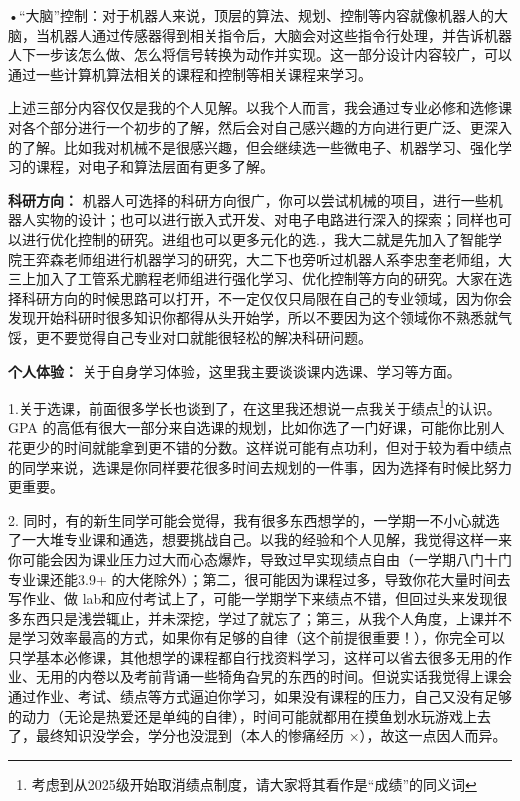 \documentclass[11pt,oneside]{book}
\begin{document}
\vspace{10pt}

•“大脑”控制：对于机器人来说，顶层的算法、规划、控制等内容就像机器人的大脑，当机器人通过传感器得到相关指令后，大脑会对这些指令行处理，并告诉机器人下一步该怎么做、怎么将信号转换为动作并实现。这一部分设计内容较广，可以通过一些计算机算法相关的课程和控制等相关课程来学习。

\vspace{10pt}

上述三部分内容仅仅是我的个人见解。以我个人而言，我会通过专业必修和选修课对各个部分进行一个初步的了解，然后会对自己感兴趣的方向进行更广泛、更深入的了解。比如我对机械不是很感兴趣，但会继续选一些微电子、机器学习、强化学习的课程，对电子和算法层面有更多了解。

\vspace{10pt}

\textbf{科研方向：}
机器人可选择的科研方向很广，你可以尝试机械的项目，进行一些机器人实物的设计；也可以进行嵌入式开发、对电子电路进行深入的探索；同样也可以进行优化控制的研究。进组也可以更多元化的选.，我大二就是先加入了智能学院王弈森老师组进行机器学习的研究，大二下也旁听过机器人系李忠奎老师组，大三上加入了工管系尤鹏程老师组进行强化学习、优化控制等方向的研究。大家在选择科研方向的时候思路可以打开，不一定仅仅只局限在自己的专业领域，因为你会发现开始科研时很多知识你都得从头开始学，所以不要因为这个领域你不熟悉就气馁，更不要觉得自己专业对口就能很轻松的解决科研问题。

\vspace{10pt}

\textbf{个人体验：}
关于自身学习体验，这里我主要谈谈课内选课、学习等方面。

\vspace{10pt}

1.关于选课，前面很多学长也谈到了，在这里我还想说一点我关于绩点\footnote{考虑到从2025级开始取消绩点制度，请大家将其看作是“成绩”的同义词}的认识。GPA 的高低有很大一部分来自选课的规划，比如你选了一门好课，可能你比别人花更少的时间就能拿到更不错的分数。这样说可能有点功利，但对于较为看中绩点的同学来说，选课是你同样要花很多时间去规划的一件事，因为选择有时候比努力更重要。

\vspace{10pt}

2. 同时，有的新生同学可能会觉得，我有很多东西想学的，一学期一不小心就选了一大堆专业课和通选，想要挑战自己。以我的经验和个人见解，我觉得这样一来你可能会因为课业压力过大而心态爆炸，导致过早实现绩点自由（一学期八门十门专业课还能3.9+ 的大佬除外）；第二，很可能因为课程过多，导致你花大量时间去写作业、做 lab和应付考试上了，可能一学期学下来绩点不错，但回过头来发现很多东西只是浅尝辄止，并未深挖，学过了就忘了；第三，从我个人角度，上课并不是学习效率最高的方式，如果你有足够的自律（这个前提很重要！），你完全可以只学基本必修课，其他想学的课程都自行找资料学习，这样可以省去很多无用的作业、无用的内卷以及考前背诵一些犄角旮旯的东西的时间。但说实话我觉得上课会通过作业、考试、绩点等方式逼迫你学习，如果没有课程的压力，自己又没有足够的动力（无论是热爱还是单纯的自律），时间可能就都用在摸鱼划水玩游戏上去了，最终知识没学会，学分也没混到（本人的惨痛经历 ×），故这一点因人而异。
\end{document}
